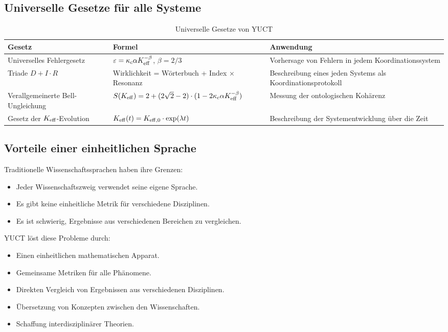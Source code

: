\documentclass[12pt,a4paper]{article}
\begin{document}
	\subsection{Universelle Gesetze für alle Systeme}
	
	\begin{table}[H]
		\centering
		\caption{Universelle Gesetze von YUCT}
		\label{tab:universal-laws}
		\begin{tabular}{p{5cm}p{6cm}p{5cm}}
			\toprule
			\textbf{Gesetz} & \textbf{Formel} & \textbf{Anwendung} \\
			\midrule
			Universelles Fehlergesetz & \(\varepsilon = \kappa_c \alpha \Keff^{-\beta}\), \(\beta = 2/3\) & Vorhersage von Fehlern in jedem Koordinationssystem \\
			Triade \(D + I \cdot R\) & Wirklichkeit = Wörterbuch + Index × Resonanz & Beschreibung eines jeden Systems als Koordinationsprotokoll \\
			Verallgemeinerte Bell-Ungleichung & \(S(\Keff) = 2 + (2\sqrt{2}-2)\cdot(1 - 2\kappa_c \alpha \Keff^{-\beta})\) & Messung der ontologischen Kohärenz \\
			Gesetz der \(\Keff\)-Evolution & \(\Keff(t) = \Keff[0] \cdot \exp(\lambda t)\) & Beschreibung der Systementwicklung über die Zeit \\
			\bottomrule
		\end{tabular}
	\end{table}
	
	\subsection{Vorteile einer einheitlichen Sprache}
	
	Traditionelle Wissenschaftssprachen haben ihre Grenzen:
	\begin{itemize}
		\item Jeder Wissenschaftszweig verwendet seine eigene Sprache.
		\item Es gibt keine einheitliche Metrik für verschiedene Disziplinen.
		\item Es ist schwierig, Ergebnisse aus verschiedenen Bereichen zu vergleichen.
	\end{itemize}
	
	YUCT löst diese Probleme durch:
	\begin{itemize}
		\item Einen einheitlichen mathematischen Apparat.
		\item Gemeinsame Metriken für alle Phänomene.
		\item Direkten Vergleich von Ergebnissen aus verschiedenen Disziplinen.
		\item Übersetzung von Konzepten zwischen den Wissenschaften.
		\item Schaffung interdisziplinärer Theorien.
	\end{itemize}
	
\end{document}
